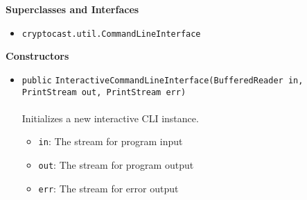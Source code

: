 \textbf{\sffamily Superclasses and Interfaces}
\begin{itemize}
\item \lstinline|cryptocast.util.CommandLineInterface|
\end{itemize}


\textbf{\sffamily Constructors}
\begin{itemize}
\item \lstinline|public| \lstinline|InteractiveCommandLineInterface|\lstinline|(BufferedReader in, PrintStream out, PrintStream err)|\\ \\[-0.6em]
Initializes a new interactive CLI instance.
\begin{itemize}
\item \lstinline|in|: The stream for program input
\item \lstinline|out|: The stream for program output
\item \lstinline|err|: The stream for error output
\end{itemize}



\end{itemize}


